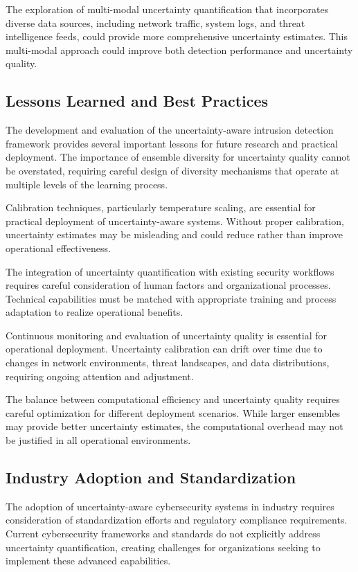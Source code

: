 \documentclass[journal]{IEEEtran}
\begin{document}
The exploration of multi-modal uncertainty quantification that incorporates diverse data sources, including network traffic, system logs, and threat intelligence feeds, could provide more comprehensive uncertainty estimates. This multi-modal approach could improve both detection performance and uncertainty quality.

\subsection{Lessons Learned and Best Practices}

The development and evaluation of the uncertainty-aware intrusion detection framework provides several important lessons for future research and practical deployment. The importance of ensemble diversity for uncertainty quality cannot be overstated, requiring careful design of diversity mechanisms that operate at multiple levels of the learning process.

Calibration techniques, particularly temperature scaling, are essential for practical deployment of uncertainty-aware systems. Without proper calibration, uncertainty estimates may be misleading and could reduce rather than improve operational effectiveness.

The integration of uncertainty quantification with existing security workflows requires careful consideration of human factors and organizational processes. Technical capabilities must be matched with appropriate training and process adaptation to realize operational benefits.

Continuous monitoring and evaluation of uncertainty quality is essential for operational deployment. Uncertainty calibration can drift over time due to changes in network environments, threat landscapes, and data distributions, requiring ongoing attention and adjustment.

The balance between computational efficiency and uncertainty quality requires careful optimization for different deployment scenarios. While larger ensembles may provide better uncertainty estimates, the computational overhead may not be justified in all operational environments.

\subsection{Industry Adoption and Standardization}

The adoption of uncertainty-aware cybersecurity systems in industry requires consideration of standardization efforts and regulatory compliance requirements. Current cybersecurity frameworks and standards do not explicitly address uncertainty quantification, creating challenges for organizations seeking to implement these advanced capabilities.
\end{document}
